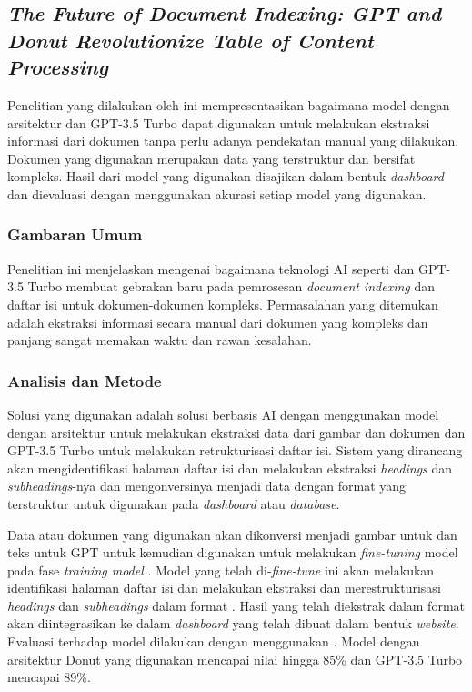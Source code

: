 \subsection{\textit{The Future of Document Indexing: GPT and Donut Revolutionize Table of Content Processing}}
\label{sec:penelitian-3}
Penelitian yang dilakukan oleh \cite{feyisa2024future} ini mempresentasikan bagaimana model dengan arsitektur \donut{} dan GPT-3.5 Turbo dapat digunakan untuk melakukan ekstraksi informasi dari dokumen tanpa perlu adanya pendekatan manual yang dilakukan. Dokumen yang digunakan merupakan data yang terstruktur dan bersifat kompleks. Hasil dari model yang digunakan disajikan dalam bentuk 
\textit{dashboard} dan dievaluasi dengan menggunakan akurasi setiap model yang digunakan.

\subsubsection{Gambaran Umum}
Penelitian ini menjelaskan mengenai bagaimana teknologi AI seperti \donut{} dan GPT-3.5 Turbo membuat gebrakan baru pada pemrosesan \emph{document indexing} dan daftar isi untuk dokumen-dokumen kompleks. Permasalahan yang ditemukan adalah ekstraksi informasi secara manual dari dokumen yang kompleks dan panjang sangat memakan waktu dan rawan kesalahan. 

\subsubsection{Analisis dan Metode}
Solusi yang digunakan adalah solusi berbasis AI dengan menggunakan model dengan arsitektur \donut{} untuk melakukan ekstraksi data dari gambar dan dokumen dan GPT-3.5 Turbo untuk melakukan retrukturisasi daftar isi. Sistem yang dirancang akan mengidentifikasi halaman daftar isi dan melakukan ekstraksi \emph{headings} dan \emph{subheadings}-nya dan mengonversinya menjadi data dengan format \json{} yang terstruktur untuk digunakan pada \emph{dashboard} atau \emph{database}.  

Data atau dokumen yang digunakan akan dikonversi menjadi gambar untuk 
\donut{} dan teks untuk GPT untuk kemudian digunakan untuk melakukan \emph{fine-tuning} model pada fase \emph{training model} \parencite{feyisa2024future}. Model yang telah di-\emph{fine-tune} ini akan melakukan identifikasi halaman daftar isi dan melakukan ekstraksi dan merestrukturisasi \emph{headings} dan \emph{subheadings} dalam format \json. Hasil yang telah diekstrak dalam format \json{} akan diintegrasikan ke dalam \emph{dashboard} yang telah dibuat dalam bentuk \emph{website}. Evaluasi terhadap model dilakukan dengan 
menggunakan \accuracy{}. Model dengan arsitektur Donut yang digunakan mencapai nilai \accuracy{} hingga 85\% dan GPT-3.5 Turbo mencapai \accuracy{} 89\%. 

